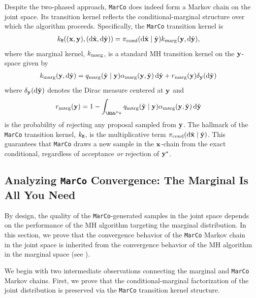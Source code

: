 \documentclass[onefignum,onetabnum]{siamonline250211}
\renewcommand{\d} {{\rm d}}                                %
\newcommand{\bfx}{{\bf x}}
\newcommand{\bfy}{{\bf y}}
\newcommand{\ny}{{n_{y}}}
\newcommand{\pcond}{\pi_{\rm cond}}
\newcommand{\MarCo}{\textnormal{\texttt{MarCo}}\xspace}
\begin{document}
Despite the two-phased approach, \MarCo does indeed form a Markov chain on the joint space. %
Its transition kernel reflects the conditional-marginal structure over which the algorithm proceeds. 
Specifically, the \MarCo transition kernel is
    \begin{align}\label{eq:marco_transition_kernel}
        k_{\tt M}((\bfx, \bfy), (\d\hat{\bfx}, \d\hat{\bfy})) 
        =\pcond(\d\hat{\bfx} \mid \hat{\bfy}) k_{\rm marg}(\bfy, \d\hat{\bfy}),
    \end{align}
where the marginal kernel, $k_{\rm marg}$, is a standard MH transition kernel on the $\bfy$-space given by
\begin{align}\label{eq:marco_transition_kernel_marginal}
    k_{\rm marg}(\bfy, \d\hat{\bfy}) = q_{\rm marg}(\hat{\bfy} \mid \bfy) \alpha_{\rm marg}(\bfy, \hat{\bfy})\, \d\hat{\bfy}+ r_{\rm marg}(\bfy) \delta_{\bfy}(\d \hat{\bfy})
    \end{align}
where $\delta_{\bfy}(\d\hat{\bfy})$ denotes the Dirac measure centered at $\bfy$ and 
\begin{align}\label{eq:marco_transition_kernel_rejection}
        r_{\rm marg}(\bfy) = 1 - \int_{\Rbb^\ny} q_{\rm marg}(\tilde{\bfy} \mid \bfy) \alpha_{\rm marg}(\bfy, \tilde{\bfy}) \, \d\tilde{\bfy}
    \end{align}
is the probability of rejecting any proposal sampled from $\bfy$.
%
%
%
%
The hallmark of the \MarCo transition kernel, $k_{\tt M}$, is the multiplicative term $\pcond(\d \hat{\bfx} \mid \hat{\bfy})$. %
This guarantees that \MarCo draws a new sample in the $\bfx$-chain from the exact conditional, regardless of acceptance \emph{or} rejection of ${\bfy}^\star$.
%
 

%
\subsection{Analyzing \MarCo Convergence: The Marginal Is All You Need}
\label{sec:marco_convergence}

By design, the quality of the \MarCo-generated samples in the joint space depends on the performance of the MH algorithm targeting the marginal distribution.
In this section, we prove that the convergence behavior of the \MarCo Markov chain in the joint space is inherited from the convergence behavior of the MH algorithm in the marginal space (see ).
%
%
%
%
%
%
%
%
%

%
We begin with two intermediate observations connecting the marginal and \MarCo Markov chains.
%
First, we prove that the conditional-marginal factorization of the joint distribution is preserved via the \MarCo transition kernel structure.
%
%
%
%
%
%
%
%
%
%
%
%
%
%
%
%
%
%
%
%
%
%
%
%
%
%
\end{document}
